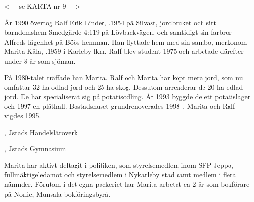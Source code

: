 
<--- se KARTA nr 9 --->





År 1990 övertog Ralf Erik Linder, .1954 på Silvast, jordbruket och sitt barndomshem Smedgärde 4:119 på Lövbackvägen, och samtidigt sin farbror Alfreds lägenhet på Böös hemman. Han flyttade hem med sin sambo, merkonom Marita Kåla, .1959 i Karleby lkm. Ralf blev student 1975 och arbetade därefter under 8 år som sjöman.

På 1980-talet träffade han Marita. Ralf och Marita har köpt mera jord, som nu omfattar 32 ha odlad jord och 25 ha skog. Dessutom arrenderar de 20 ha odlad jord. De har specialiserat sig på potatisodling. År 1993 byggde de ett potatislager och 1997 en plåthall. Bostadshuset grundrenoverades 1998--. Marita och Ralf vigdes 1995.
\begin{jhchildren}
  \item {}, Jstads Handelsläroverk
  \item {}, Jstads Gymnasium
\end{jhchildren}
Marita har aktivt deltagit i politiken, som styrelsemedlem inom SFP Jeppo, fullmäktigeledamot och styrelsemedlem i Nykarleby stad samt medlem i flera nämnder. Förutom i det egna packeriet har Marita arbetat ca 2 år som bokförare på Norlic, Munsala bokföringsbyrå.



